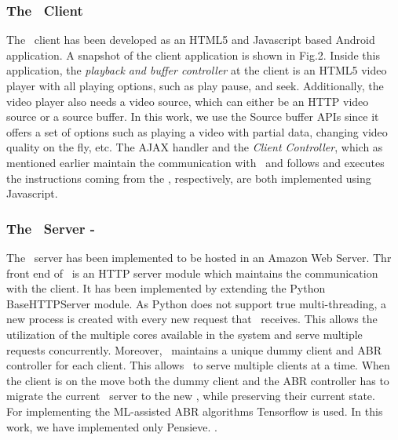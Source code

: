 


\subsubsection{The \bel\ Client}
The \bel\ client has been developed as an HTML5 and Javascript based Android application. A snapshot of the client application is shown in Fig.2. Inside this application, the \textit{playback and buffer controller} at the client is an HTML5 video player with all playing options, such as play pause, and seek. Additionally, the video player also needs a video source, which can either be an HTTP video source or a source buffer. In this work, we use the Source buffer APIs since it offers a set of options  such as playing a video with partial data, changing video quality on the fly, etc. The  AJAX handler and the \textit{Client Controller}, which as mentioned earlier maintain the communication with \servname\  and follows and executes the instructions coming from the \servname, respectively, are both implemented using Javascript.
\subsubsection{The \bel\ Server - \servname}
The \servname\ server has been implemented to be hosted in an Amazon Web Server. Thr front end of \servname\ is an HTTP server module which maintains the communication with the client.  It has been implemented by extending the Python BaseHTTPServer module. As Python does not support true multi-threading, a new process is created with every new request that \servname\ receives. This allows the utilization of the multiple cores available in the system and serve multiple requests concurrently. Moreover, \servname\ maintains a unique dummy client and \ac{ABR} controller for each client. This allows \servname\ to serve multiple clients at a time. When the client is on the move both the dummy client and the \ac{ABR} controller has to migrate the current \servname\ server to the new \servname, while preserving their current state.\\
\indent For implementing the ML-assisted \ac{ABR} algorithms Tensorflow is used. In this work, we have implemented only Pensieve. .
